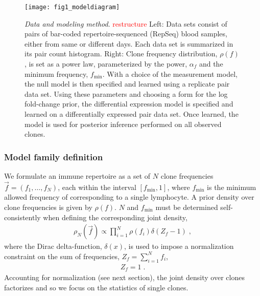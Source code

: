 \documentclass[letterpaper,english,prl,reprint,longbibliography]{revtex4-1} %
\newcommand{\re}[1]{\textcolor{red}{#1}}
\begin{document}
\begin{figure}[ht!]
\texttt{[image: fig1\_modeldiagram]}
\centering{}
\caption{
\emph{Data and modeling method}. \re{restructure} 
Left: Data sets consist of pairs of bar-coded repertoire-sequenced (RepSeq) blood samples, either from same or different days. Each data set is summarized in its pair count histogram. Right: Clone frequency distribution, $\rho(f)$, is set as a power law, parameterized by the power, $\alpha_f$ and the minimum frequency, $f_{\textrm{min}}$. With a choice of the measurement model, the null model is then specified and learned using a replicate pair data set. Using these parameters and choosing a form for the log fold-change prior, the differential expression model is specified and learned on a differentially expressed pair data set. Once learned, the model is used for posterior inference performed on all observed clones.
\label{fig:fullmodel}}
\end{figure}

\subsubsection*{Model family definition}

We formulate an immune repertoire as a set of $N$ clone frequencies $\vec{f}=(f_1,\dots,f_N)$, each within the interval $[f_{\textrm{min}},1]$, where $f_{\textrm{min}}$ is the minimum allowed frequency of corresponding to a single lymphocyte. A prior density over clone frequencies is given by $\rho(f)$. $N$ and $f_{\textrm{min}}$ must be determined self-consistently when defining the corresponding joint density, 
\begin{eqnarray}
	\rho_N(\vec{f})\propto \prod_{i=1}^N\rho(f_i)\delta(Z_f-1)\;,\label{eq:jointf}
\end{eqnarray}
where the Dirac delta-function, $\delta(x)$, is used to impose a normalization constraint on the sum of frequencies, $Z_f=\sum_{i=1}^N f_i$, 
\begin{align}
  Z_f=1\;. \label{eq:norm_constr}
\end{align}
Accounting for normalization (see next section), the joint density over clones factorizes and so we focus on the statistics of single clones. 
\end{document}
